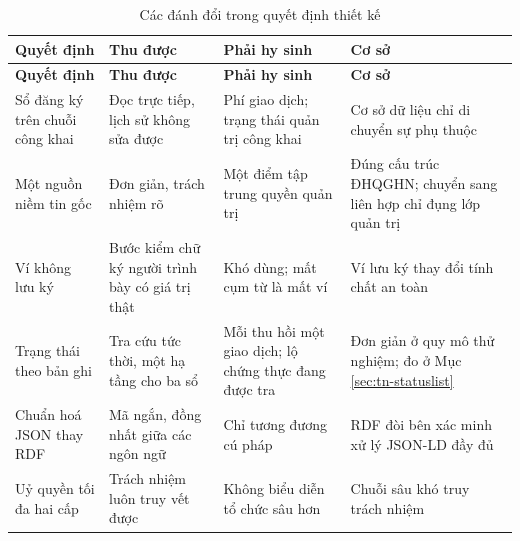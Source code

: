 \begin{longtable}{|p{3.0cm}|p{3.5cm}|p{3.5cm}|p{3.6cm}|}
\caption{Các đánh đổi trong quyết định thiết kế}
\label{tab:v2-tradeoff} \\
\hline
\textbf{Quyết định} & \textbf{Thu được} & \textbf{Phải hy sinh} & \textbf{Cơ sở} \\ \hline
\endfirsthead
\hline
\textbf{Quyết định} & \textbf{Thu được} & \textbf{Phải hy sinh} & \textbf{Cơ sở} \\ \hline
\endhead
Sổ đăng ký trên chuỗi công khai & Đọc trực tiếp, lịch sử không sửa được & Phí giao dịch; trạng thái quản trị công khai & Cơ sở dữ liệu chỉ di chuyển sự phụ thuộc \\ \hline
Một nguồn niềm tin gốc & Đơn giản, trách nhiệm rõ & Một điểm tập trung quyền quản trị & Đúng cấu trúc ĐHQGHN; chuyển sang liên hợp chỉ đụng lớp quản trị \\ \hline
Ví không lưu ký & Bước kiểm chữ ký người trình bày có giá trị thật & Khó dùng; mất cụm từ là mất ví & Ví lưu ký thay đổi tính chất an toàn \\ \hline
Trạng thái theo bản ghi & Tra cứu tức thời, một hạ tầng cho ba sổ & Mỗi thu hồi một giao dịch; lộ chứng thực đang được tra & Đơn giản ở quy mô thử nghiệm; đo ở Mục \ref{sec:tn-statuslist} \\ \hline
Chuẩn hoá JSON thay RDF & Mã ngắn, đồng nhất giữa các ngôn ngữ & Chỉ tương đương cú pháp & RDF đòi bên xác minh xử lý JSON-LD đầy đủ \\ \hline
Uỷ quyền tối đa hai cấp & Trách nhiệm luôn truy vết được & Không biểu diễn tổ chức sâu hơn & Chuỗi sâu khó truy trách nhiệm \\ \hline
\end{longtable}
